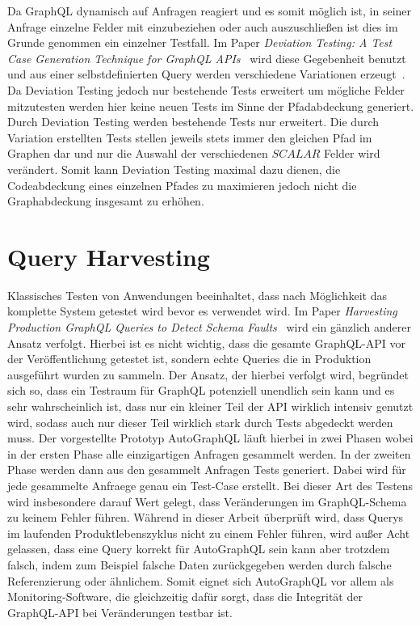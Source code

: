 Da GraphQL dynamisch auf Anfragen reagiert und es somit möglich ist, in seiner Anfrage einzelne Felder mit einzubeziehen
oder auch auszuschließen ist dies im Grunde genommen ein einzelner Testfall.
Im Paper \textit{Deviation Testing: A Test Case Generation Technique for GraphQL APIs}~\cite{deviation} wird diese Gegebenheit benutzt und
aus einer selbstdefinierten Query werden verschiedene Variationen erzeugt~\cite[vgl. 3]{deviation}.
Da Deviation Testing jedoch nur bestehende Tests erweitert um mögliche Felder mitzutesten werden hier keine neuen Tests  im Sinne der Pfadabdeckung generiert.
Durch Deviation Testing werden bestehende Tests nur erweitert.
Die durch Variation erstellten Tests stellen jeweils stets immer den gleichen Pfad im Graphen dar und nur die Auswahl der verschiedenen $SCALAR$ Felder wird verändert.
Somit kann Deviation Testing maximal dazu dienen, die Codeabdeckung eines einzelnen Pfades zu maximieren jedoch nicht die Graphabdeckung insgesamt zu erhöhen.

\section{Query Harvesting}

Klassisches Testen von Anwendungen beeinhaltet, dass nach Möglichkeit das komplette System getestet wird bevor es verwendet wird.
Im Paper \textit{Harvesting Production GraphQL Queries to Detect Schema Faults}~\cite{harvesting} wird ein gänzlich anderer Ansatz verfolgt.
Hierbei ist es nicht wichtig, dass die gesamte GraphQL-API vor der Veröffentlichung getestet ist, sondern echte Queries die in Produktion ausgeführt wurden zu sammeln.
Der Ansatz, der hierbei verfolgt wird, begründet sich so, dass ein Testraum für GraphQL potenziell unendlich sein kann und es sehr wahrscheinlich ist, dass nur ein kleiner
Teil der API wirklich intensiv genutzt wird, sodass auch nur dieser Teil wirklich stark durch Tests abgedeckt werden muss.
Der vorgestellte Prototyp AutoGraphQL läuft hierbei in zwei Phasen wobei in der ersten Phase alle einzigartigen Anfragen gesammelt werden.
In der zweiten Phase werden dann aus den gesammelt Anfragen Tests generiert.
Dabei wird für jede gesammelte Anfraege genau ein Test-Case erstellt.
Bei dieser Art des Testens wird insbesondere darauf Wert gelegt, dass Veränderungen im GraphQL-Schema zu keinem Fehler führen.
Während in dieser Arbeit überprüft wird, dass Querys im laufenden Produktlebenszyklus nicht zu einem Fehler führen, wird außer Acht gelassen,
dass eine Query korrekt für AutoGraphQL sein kann aber trotzdem falsch, indem zum Beispiel falsche Daten zurückgegeben werden
durch falsche Referenzierung oder ähnlichem.
Somit eignet sich AutoGraphQL vor allem als Monitoring-Software, die gleichzeitig dafür sorgt, dass die Integrität der GraphQL-API bei Veränderungen
testbar ist.

